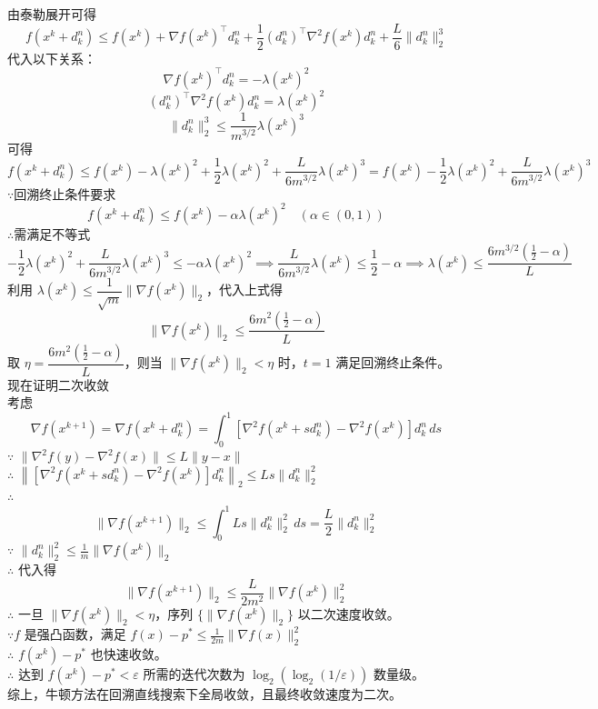 \documentclass{article}
\newenvironment{solution_cn}{%
  \begin{proof}[解答]%
  \kaishu  %
}{%
  \end{proof}%
}
\begin{document}
\begin{solution_cn}
由泰勒展开可得
$$
f({x}^k + {d}_k^n) \leq f({x}^k) + \nabla f({x}^k)^\top {d}_k^n + \frac{1}{2} ({d}_k^n)^\top \nabla^2 f({x}^k) {d}_k^n + \frac{L}{6} \|{d}_k^n\|_2^3
$$  
代入以下关系：  
$$\nabla f({x}^k)^\top {d}_k^n = -\lambda({x}^k)^2
$$  
$$({d}_k^n)^\top \nabla^2 f({x}^k) {d}_k^n = \lambda({x}^k)^2
$$  
$$\|{d}_k^n\|_2^3 \leq \dfrac{1}{m^{3/2}} \lambda({x}^k)^3
$$
可得
$$
f({x}^k +{d}_k^n) \leq f({x}^k) - \lambda({x}^k)^2 + \frac{1}{2} \lambda({x}^k)^2 + \frac{L}{6m^{3/2}} \lambda({x}^k)^3 = f({x}^k) - \frac{1}{2} \lambda({x}^k)^2 + \frac{L}{6m^{3/2}} \lambda({x}^k)^3
$$
$\because$回溯终止条件要求
$$
f({x}^k + {d}_k^n) \leq f({x}^k) - \alpha \lambda({x}^k)^2 \quad (\alpha \in (0,1))
$$  
$\therefore$需满足不等式
$$
-\frac{1}{2} \lambda({x}^k)^2 + \frac{L}{6m^{3/2}} \lambda({x}^k)^3 \leq -\alpha \lambda({x}^k)^2
\implies
\frac{L}{6m^{3/2}} \lambda({x}^k) \leq \frac{1}{2} - \alpha \implies \lambda({x}^k) \leq \frac{6m^{3/2} \left( \frac{1}{2} - \alpha \right)}{L}
$$  
利用 $\lambda({x}^k) \leq \dfrac{1}{\sqrt{m}} \|\nabla f({x}^k)\|_2$，代入上式得
$$
\|\nabla f({x}^k)\|_2 \leq \frac{6m^2 \left( \frac{1}{2} - \alpha \right)}{L}
$$  
取 $\eta = \dfrac{6m^2 \left( \frac{1}{2} - \alpha \right)}{L}$，则当 $\|\nabla f({x}^k)\|_2 < \eta$ 时，$t=1$ 满足回溯终止条件。\\
现在证明二次收敛\\
考虑
$$
\nabla f({x}^{k+1}) = \nabla f\left({x}^k + {d}_k^n\right) = \int_0^1 \left[ \nabla^2 f({x}^k + s{d}_k^n) - \nabla^2 f({x}^k) \right] {d}_k^n \, ds
$$  
$\because$ $\|\nabla^2 f({y}) - \nabla^2 f({x})\| \leq L\|{y}-{x}\|$\\
$\therefore$ $\left\|\left[\nabla^2 f({x}^k + s{d}_k^n) - \nabla^2 f({x}^k)\right] {d}_k^n\right\|_2 \leq L s \|{d}_k^n\|_2^2$ \\
$\therefore$  
$$
\|\nabla f({x}^{k+1})\|_2 \leq \int_0^1 L s \|{d}_k^n\|_2^2 \, ds = \frac{L}{2} \|{d}_k^n\|_2^2
$$  
$\because$ $\|{d}_k^n\|_2^2 \leq \frac{1}{m} \|\nabla f({x}^k)\|_2$\\
$\therefore$ 代入得
$$ 
\|\nabla f({x}^{k+1})\|_2 \leq \frac{L}{2m^2} \|\nabla f({x}^k)\|_2^2
$$  
$\therefore$ 一旦 $\|\nabla f({x}^k)\|_2 < \eta$，序列 $\{\|\nabla f({x}^k)\|_2\}$ 以二次速度收敛。\\
$\because$$f$ 是强凸函数，满足 $f({x}) - p^* \leq \frac{1}{2m} \|\nabla f({x})\|_2^2$\\
$\therefore$ $f({x}^k) - p^*$ 也快速收敛。\\
$\therefore$ 达到 $f({x}^k) - p^* < \varepsilon$ 所需的迭代次数为 $\log_2(\log_2(1/\varepsilon))$ 数量级。\\  
综上，牛顿方法在回溯直线搜索下全局收敛，且最终收敛速度为二次。  
\end{solution_cn}

\end{document}
